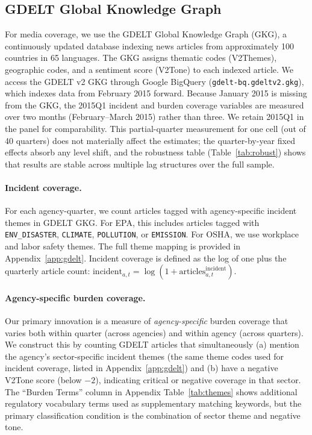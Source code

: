 \documentclass[12pt]{article}
\begin{document}
\subsection{GDELT Global Knowledge Graph}

For media coverage, we use the GDELT Global Knowledge Graph (GKG), a continuously updated database indexing news articles from approximately 100 countries in 65 languages. The GKG assigns thematic codes (V2Themes), geographic codes, and a sentiment score (V2Tone) to each indexed article. We access the GDELT v2 GKG through Google BigQuery (\texttt{gdelt-bq.gdeltv2.gkg}), which indexes data from February 2015 forward. Because January 2015 is missing from the GKG, the 2015Q1 incident and burden coverage variables are measured over two months (February--March 2015) rather than three. We retain 2015Q1 in the panel for comparability. This partial-quarter measurement for one cell (out of 40 quarters) does not materially affect the estimates; the quarter-by-year fixed effects absorb any level shift, and the robustness table (Table~\ref{tab:robust}) shows that results are stable across multiple lag structures over the full sample.

\paragraph{Incident coverage.} For each agency-quarter, we count articles tagged with agency-specific incident themes in GDELT GKG. For EPA, this includes articles tagged with \texttt{ENV\_DISASTER}, \texttt{CLIMATE}, \texttt{POLLUTION}, or \texttt{EMISSION}. For OSHA, we use workplace and labor safety themes. The full theme mapping is provided in Appendix~\ref{app:gdelt}. Incident coverage is defined as the log of one plus the quarterly article count: $\text{incident}_{a,t} = \log(1 + \text{articles}_{a,t}^{\text{incident}})$.

\paragraph{Agency-specific burden coverage.} Our primary innovation is a measure of \emph{agency-specific} burden coverage that varies both within quarter (across agencies) and within agency (across quarters). We construct this by counting GDELT articles that simultaneously (a) mention the agency's sector-specific incident themes (the same theme codes used for incident coverage, listed in Appendix~\ref{app:gdelt}) and (b) have a negative V2Tone score (below $-2$), indicating critical or negative coverage in that sector. The ``Burden Terms'' column in Appendix Table~\ref{tab:themes} shows additional regulatory vocabulary terms used as supplementary matching keywords, but the primary classification condition is the combination of sector theme and negative tone.
\end{document}
